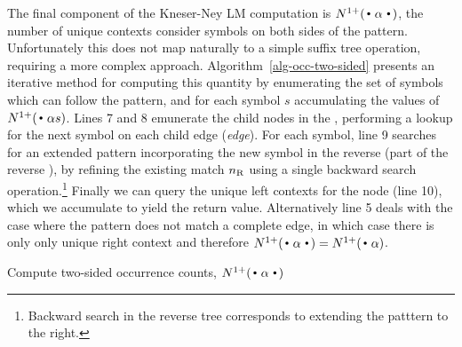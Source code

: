 The final component of the Kneser-Ney LM computation is
$\nlplus{\dotpatdot}$, the number of unique contexts consider symbols
on both sides of the pattern. 
Unfortunately this does not map naturally to a simple suffix tree operation,
requiring a more complex approach.
Algorithm~\ref{alg-occ-two-sided} presents an iterative method for computing this quantity by enumerating the set of symbols which can follow the pattern, and for each symbol $s$ accumulating the values of $\nlplus{\Bigcdot \alpha s}$.
Lines 7 and 8 emunerate the child nodes in the \CST, performing a lookup for the next symbol on each child edge (\emph{edge}).
For each symbol, line 9 searches for an extended pattern incorporating the new symbol in the reverse \CSA (part of the reverse \CST), by refining the existing match $n_{\text{R}}$ using a single backward search operation.\footnote{Backward search in the reverse tree corresponds to extending the patttern to the right.}
Finally we can query the unique left contexts for the node (line 10),
which we accumulate to yield the return value.
Alternatively line 5 deals with the case where the pattern does not match a complete edge, in which case there is only only unique right context and therefore $\nlplus{\dotpatdot} = \nlplus{\dotpat}$.

\begin{algorithm}[t]
  \caption{Compute two-sided occurrence counts, $\nlplus{\dotpatdot}$ 
    \label{alg:n1plusfb}}
  \begin{algorithmic}[1]
        \Else
           \For{$\chf \gets \children{\tf}{\nf}$} 
            \EndFor
        \EndIf
      \State {}
    \EndFunction
  \end{algorithmic}
\label{alg-occ-two-sided}
\end{algorithm}


